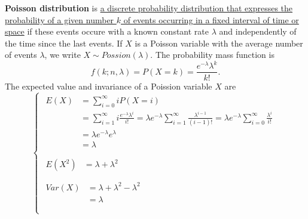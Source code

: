 \documentclass[10pt,onecolumn]{book}
\begin{document}
\textbf{Poisson distribution} is \uline{a discrete probability distribution that expresses the probability of a given number $k$ of events occurring in a fixed interval of time or space} if these events occure with a known constant rate $\lambda$ and independently of the time since the last events. If $X$ is a Poisson variable with the average number of events $\lambda$, we write $X \sim Possion(\lambda)$. The probability mass function is
\begin{equation}
f(k; n, \lambda) = P(X = k) = \frac{e^{-\lambda} \lambda^k}{k!}.
\end{equation}
The expected value and invariance of a Poission variable $X$ are
\begin{equation}\label{eq:poisson_distribution_e_var}
\left\{
	\begin{array}{lr}
	\begin{split}
	E(X)  & = \sum_{i=0}^{\infty} i P(X = i) \\
		  & = \sum_{i=1}^{\infty} i \frac{e^{-\lambda} \lambda^i}{i!} 
		    = \lambda e^{-\lambda} \sum_{i=1}^{\infty} \frac{\lambda^{i - 1}}{(i - 1)!} 
		    = \lambda e^{-\lambda} \sum_{i=0}^{\infty} \frac{\lambda^{i}}{i!} \\
		  & = \lambda e^{-\lambda} e ^ \lambda \\
		  & = \lambda \\
	\end{split} \\
	\begin{split}
	E(X^2) & = \lambda + \lambda ^ 2 \\
	\end{split} \\
	\begin{split}
	Var(X) & = \lambda + \lambda ^ 2 - \lambda^2 \\
		   & = \lambda \\
	\end{split}  \\
	\end{array}
\right.
\end{equation}
{} 
\end{document}
